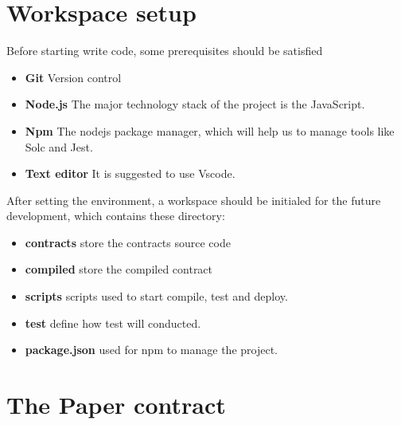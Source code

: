 \documentclass[openany,12pt]{ecsthesis}      %
\begin{document}
\section{Workspace setup}
Before starting write code, some prerequisites should be satisfied
\begin{itemize}
  \item \textbf{Git} Version control
  \item \textbf{Node.js} The major technology stack of the project is the JavaScript.
  \item \textbf{Npm} The nodejs package manager, which will help us to manage tools like Solc and Jest.
  \item \textbf{Text editor} It is suggested to use Vscode. 
\end{itemize}
After setting the environment, a workspace should be initialed for the future development, 
which contains these directory:
\begin{itemize}
  \item \textbf{contracts} store the contracts source code
  \item \textbf{compiled} store the compiled contract
  \item \textbf{scripts} scripts used to start compile, test and deploy.
  \item \textbf{test} define how test will conducted. 
  \item \textbf{package.json} used for npm to manage the project.
\end{itemize}  
\section{The Paper contract}
\end{document}
